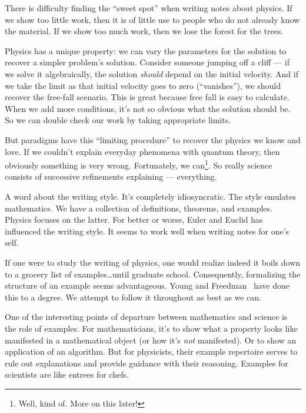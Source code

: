 There is difficulty finding the ``sweet spot'' when writing notes about
physics. If we show too little work, then it is of little use to people
who do not already know the material. If we show too much work, then we
lose the forest for the trees.


Physics has a unique property: we can vary the parameters for the
solution to recover a simpler problem's solution. Consider someone
jumping off a cliff --- if we solve it algebraically, the
solution \emph{should} depend on the initial velocity. And if we take
the limit as that initial velocity goes to zero (``vanishes''), we
should recover the free-fall scenario. This is great because free fall
is easy to calculate. When we add more conditions, it's not so obvious
what the solution should be. So we can double check our work by taking
appropriate limits.

But paradigms have this ``limiting procedure'' to recover the physics we
know and love. If we couldn't explain everyday phenomena with quantum
theory, then obviously something is very wrong. Fortunately, we
can\footnote{Well, kind of. More on this later!}. So really science
consists of successive refinements explaining --- everything.

 A word about the writing style. It's completely
idiosyncratic. The style emulates mathematics. We have a collection of
definitions, theorems, and examples. Physics focuses on the latter. For
better or worse, Euler and Euclid has influenced the writing style. It
seems to work well when writing notes for one's self.

If one were to study the writing of physics, one would realize indeed it
boils down to a grocery list of examples\dots until graduate
school. Consequently, formalizing the structure of an example seems
advantageous. Young and Freedman~\cite{young} have done this to a degree. We
attempt to follow it throughout as best as we can.

One of the interesting points of departure between mathematics and
science is the role of examples. For mathematicians, it's to show what a
property looks like manifested in a mathematical object (or how it's
\emph{not} manifested). Or to show an application of an algorithm. But
for physicists, their example repertoire serves to rule out explanations
and provide guidance with their reasoning. Examples for scientists are
like entrees for chefs.

